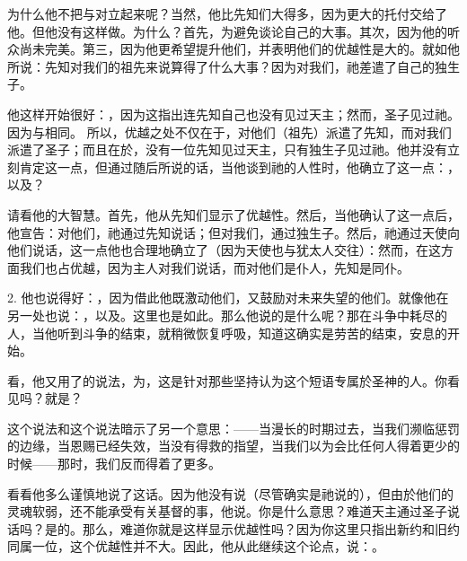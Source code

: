 为什么他不把与对立起来呢？当然，他比先知们大得多，因为更大的托付交给了他。但他没有这样做。为什么？首先，为避免谈论自己的大事。其次，因为他的听众尚未完美。第三，因为他更希望提升他们，并表明他们的优越性是大的。就如他所说：先知对我们的祖先来说算得了什么大事？因为对我们，祂差遣了自己的独生子。\par

他这样开始很好：，因为这指出连先知自己也没有见过天主；然而，圣子见过祂。因为与相同。 所以，优越之处不仅在于，对他们（祖先）派遣了先知，而对我们派遣了圣子；而且在於，没有一位先知见过天主，只有独生子见过祂。他并没有立刻肯定这一点，但通过随后所说的话，当他谈到祂的人性时，他确立了这一点：，以及？\par

请看他的大智慧。首先，他从先知们显示了优越性。然后，当他确认了这一点后，他宣告：对他们，祂通过先知说话；但对我们，通过独生子。然后，祂通过天使向他们说话，这一点他也合理地确立了（因为天使也与犹太人交往）：然而，在这方面我们也占优越，因为主人对我们说话，而对他们是仆人，先知是同仆。\par

2. 他也说得好：，因为借此他既激动他们，又鼓励对未来失望的他们。就像他在另一处也说：，以及。这里也是如此。那么他说的是什么呢？那在斗争中耗尽的人，当他听到斗争的结束，就稍微恢复呼吸，知道这确实是劳苦的结束，安息的开始。\par

看，他又用了的说法，为，这是针对那些坚持认为这个短语专属於圣神的人。你看见吗？就是？\par

这个说法和这个说法暗示了另一个意思：——当漫长的时期过去，当我们濒临惩罚的边缘，当恩赐已经失效，当没有得救的指望，当我们以为会比任何人得着更少的时候——那时，我们反而得着了更多。\par

看看他多么谨慎地说了这话。因为他没有说（尽管确实是祂说的），但由於他们的灵魂软弱，还不能承受有关基督的事，他说。你是什么意思？难道天主通过圣子说话吗？是的。那么，难道你就是这样显示优越性吗？因为你这里只指出新约和旧约同属一位，这个优越性并不大。因此，他从此继续这个论点，说：。\par

